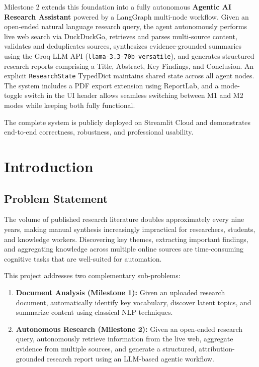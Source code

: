 \documentclass[12pt, a4paper]{article}
\begin{document}
Milestone 2 extends this foundation into a fully autonomous \textbf{Agentic AI Research Assistant} powered by a LangGraph multi-node workflow. Given an open-ended natural language research query, the agent autonomously performs live web search via DuckDuckGo, retrieves and parses multi-source content, validates and deduplicates sources, synthesizes evidence-grounded summaries using the Groq LLM API (\texttt{llama-3.3-70b-versatile}), and generates structured research reports comprising a Title, Abstract, Key Findings, and Conclusion. An explicit \texttt{ResearchState} TypedDict maintains shared state across all agent nodes. The system includes a PDF export extension using ReportLab, and a mode-toggle switch in the UI header allows seamless switching between M1 and M2 modes while keeping both fully functional.

The complete system is publicly deployed on Streamlit Cloud and demonstrates end-to-end correctness, robustness, and professional usability.

\section{Introduction}

\subsection{Problem Statement}
The volume of published research literature doubles approximately every nine years, making manual synthesis increasingly impractical for researchers, students, and knowledge workers. Discovering key themes, extracting important findings, and aggregating knowledge across multiple online sources are time-consuming cognitive tasks that are well-suited for automation.

This project addresses two complementary sub-problems:
\begin{enumerate}
  \item \textbf{Document Analysis (Milestone 1):} Given an uploaded research document, automatically identify key vocabulary, discover latent topics, and summarize content using classical NLP techniques.
  \item \textbf{Autonomous Research (Milestone 2):} Given an open-ended research query, autonomously retrieve information from the live web, aggregate evidence from multiple sources, and generate a structured, attribution-grounded research report using an LLM-based agentic workflow.
\end{enumerate}
\end{document}

